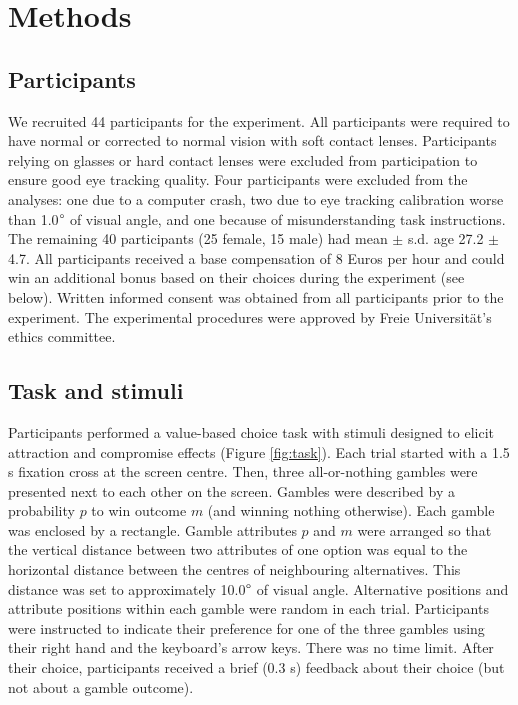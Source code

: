 \documentclass[11pt, a4paper]{article}
\begin{document}
\section*{Methods}
\label{sec:methods}

\subsection*{Participants}

We recruited 44 participants for the experiment. All participants were required to have normal or corrected to normal vision with soft contact lenses. Participants relying on glasses or hard contact lenses were excluded from participation to ensure good eye tracking quality. Four participants were excluded from the analyses: one due to a computer crash, two due to eye tracking calibration worse than 1.0$\degree$ of visual angle, and one because of misunderstanding task instructions.  The remaining 40 participants (25 female, 15 male) had mean $\pm$ s.d. age 27.2 $\pm$ 4.7. All participants received a base compensation of 8 Euros per hour and could win an additional bonus based on their choices during the experiment (see below). Written informed consent was obtained from all participants prior to the experiment. The experimental procedures were approved by Freie Universität’s ethics committee.

\subsection*{Task and stimuli}
\label{sec:methods:task-stimuli}

Participants performed a value-based choice task with stimuli designed to elicit attraction and compromise effects (Figure \ref{fig:task}). Each trial started with a 1.5 s fixation cross at the screen centre. Then, three all-or-nothing gambles were presented next to each other on the screen. Gambles were described by a probability $p$ to win outcome $m$ (and winning nothing otherwise). Each gamble was enclosed by a rectangle. Gamble attributes $p$ and $m$ were arranged so that the vertical distance between two attributes of one option was equal to the horizontal distance between the centres of neighbouring alternatives. This distance was set to approximately 10.0$\degree$ of visual angle. Alternative positions and attribute positions within each gamble were random in each trial. Participants were instructed to indicate their preference for one of the three gambles using their right hand and the keyboard’s arrow keys. There was no time limit. After their choice, participants received a brief (0.3 s) feedback about their choice (but not about a gamble outcome).
\end{document}

